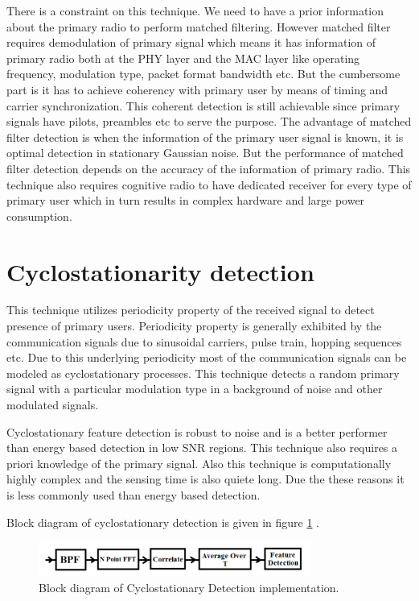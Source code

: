 There is a constraint on this technique. We need to have a prior information 
about the primary radio to perform matched filtering. However matched filter 
requires demodulation of primary signal which means it has information of 
primary radio both at the PHY layer and the MAC layer like operating frequency, 
modulation type, packet format bandwidth etc. But the cumbersome part is it has 
to achieve coherency with primary user by means of timing and carrier 
synchronization. This coherent detection is still achievable since primary 
signals have pilots, preambles etc to serve the purpose. 
The advantage of matched filter detection is when the information of the primary
user signal is known, it is optimal detection in stationary Gaussian noise. But 
the performance of matched filter detection depends on the accuracy of the 
information of primary radio. This technique also requires cognitive radio to 
have dedicated receiver for every type of primary user which in turn results in 
complex hardware and large power consumption\cite{mansi11}.

\section{Cyclostationarity detection}

This technique utilizes periodicity property of the received signal to detect 
presence of primary users. Periodicity property is generally exhibited by the 
communication signals due to sinusoidal carriers, pulse train, hopping sequences
etc. Due to this underlying periodicity most of the communication signals can be
modeled as cyclostationary processes. This 
technique detects a random primary signal with a particular modulation type in a
background of noise and other modulated signals.

Cyclostationary feature detection is robust to noise and is a better performer 
than energy based detection in low SNR regions. This technique also requires a 
priori knowledge of the primary signal. Also this technique is computationally 
highly complex and the sensing time is also quiete long. Due the these reasons 
it is less commonly used than energy based detection.

Block diagram of cyclostationary detection is given in figure \ref{csd}
\cite{mansi11}.


\begin{figure}[h]
\centering
\includegraphics[width=0.8\textwidth]{csd}
\caption[Cyclostationary Detection implementation]{Block diagram 
of Cyclostationary Detection implementation.}
\label{csd}
\end{figure}
 

